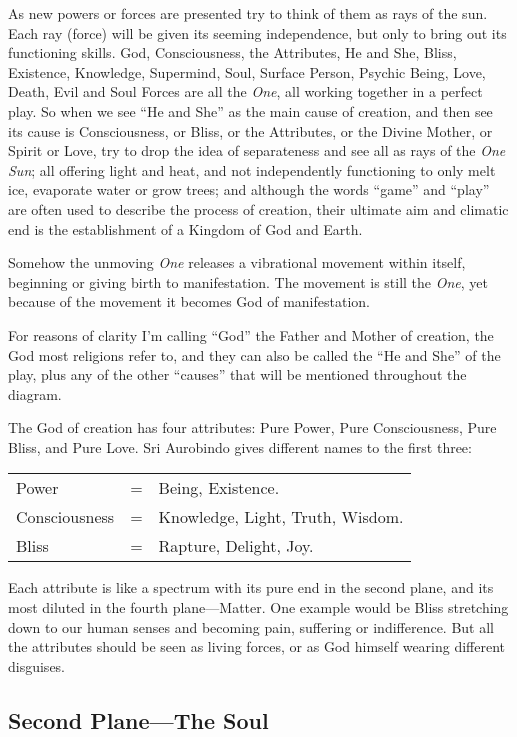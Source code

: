 \documentclass[12pt,a4paper]{book}
\begin{document}
As new powers or forces are presented try to think of them as rays of
the sun. Each ray (force) will be given its seeming independence, but
only to bring out its functioning skills. God, Consciousness, the
Attributes, He and She, Bliss, Existence, Knowledge, Supermind, Soul,
Surface Person, Psychic Being, Love, Death, Evil and Soul Forces are
all the \emph{One}, all working together in a perfect play. So when we see
``He and She'' as the main cause of creation, and then see its cause
is Consciousness, or Bliss, or the Attributes, or the Divine Mother,
or Spirit or Love, try to drop the idea of separateness and see all as
rays of the \emph{One Sun}; all offering light and heat, and not
independently functioning to only melt ice, evaporate water or grow
trees; and although the words ``game'' and ``play'' are often used to
describe the process of creation, their ultimate aim and climatic end
is the establishment of a Kingdom of God and Earth.

Somehow the unmoving \emph{One} releases a vibrational movement within
itself, beginning or giving birth to manifestation. The movement is
still the \emph{One}, yet because of the movement it becomes God of
manifestation.

For reasons of clarity I'm calling ``God'' the Father and Mother of
creation, the God most religions refer to, and they can also be called
the ``He and She'' of the play, plus any of the other ``causes'' that
will be mentioned throughout the diagram.

The God of creation has four attributes: Pure Power, Pure
Consciousness, Pure Bliss, and Pure Love. Sri Aurobindo gives
different names to the first three:

\begin{tabular}{lcl}
Power 		& = & Being, Existence.\\
Consciousness   & = & Knowledge, Light, Truth, Wisdom.\\
Bliss		& = & Rapture, Delight, Joy.
\end{tabular}

Each attribute is like a spectrum with its pure end in the second
plane, and its most diluted in the fourth plane---Matter. One example
would be Bliss stretching down to our human senses and becoming pain,
suffering or indifference. But all the attributes should be seen as
living forces, or as God himself wearing different disguises.


\newpage
\begin{center}\section*{Second Plane---The Soul}\end{center}
\end{document}
